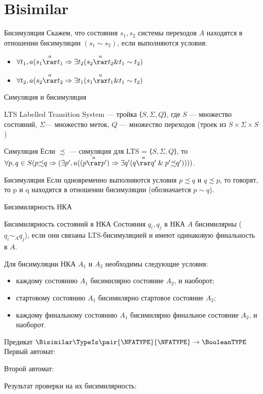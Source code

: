 \section{Bisimilar}
\begin{frame}{Бисимуляция}
    Скажем, что состояния $s_1, s_2$ системы переходов $A$ находятся в отношении бисимуляции $(s_1 \sim s_2)$, если выполняются условия:    \begin{itemize}
        \item $\forall t_1, a({s_1}\overset{a}{\rar}{t_1} \Rightarrow \exists t_2({s_2}\overset{a}{\rar}{t_2} \& t_1 \sim t_2)$
        \item $\forall t_2, a({s_2}\overset{a}{\rar}{t_2} \Rightarrow \exists t_1({s_1}\overset{a}{\rar}{t_1} \& t_1 \sim t_2)$
    \end{itemize}
\end{frame}
\begin{frame}{Симуляция и бисимуляция}
    \begin{block}{LTS}
        Labelled Transition System — тройка ⟨$S, \Sigma, Q$⟩, где $S$ — множество состояний, $\Sigma$— множество меток, $Q$ — множество переходов (троек из $S \times \Sigma \times S$)
    \end{block}
    \begin{block}{Симуляция}
        Если $\precsim$ — симуляция для LTS = ⟨$S, \Sigma, Q$⟩, то $\forall p, q \in S(p {\precsim} q \Rightarrow (\exists p', a (({p}\overset{a}{\rar}{p'}) \Rightarrow \exists q' ({q}\overset{a}{\rar}{q'} \: \& \: p' {\precsim} q'))))$.
    \end{block}
    \begin{block}{Бисимуляция}
        Если одновременно выполняются условия $p {\precsim} q$ и $q {\precsim} p$, то говорят, то p и q находятся в отношении бисимуляции (обозначается $p \sim q$).
    \end{block}
\end{frame}
\begin{frame}{Бисимилярность НКА}
    \begin{block}{Бисимилярность состояний в НКА}
        Состояния $q_i, q_j$ в НКА $A$ бисимилярны ($q_i \sim_A q_j$), если они связаны LTS-бисимуляцией и имеют одинаковую финальность в $A$.
    \end{block}
    Для бисимуляции НКА $A_1$ и $A_2$ необходимы следующие условия:
    \begin{itemize}
        \item каждому состоянию $A_1$ бисимилярно состояние $A_2$, и наоборот;
        \item стартовому состоянию $A_1$ бисимилярно стартовое состояние $A_2$;
        \item каждому финальному состоянию $A_1$ бисимилярно финальное состояние $A_2$, и наоборот.
    \end{itemize}
\end{frame}
\begin{frame}{Предикат $\Bisimilar\TypeIs\pair{\NFATYPE}{\NFATYPE}\to\BooleanTYPE$}
	Первый автомат:


	Второй автомат:


	Результат проверки на их бисимилярность:

\end{frame}
